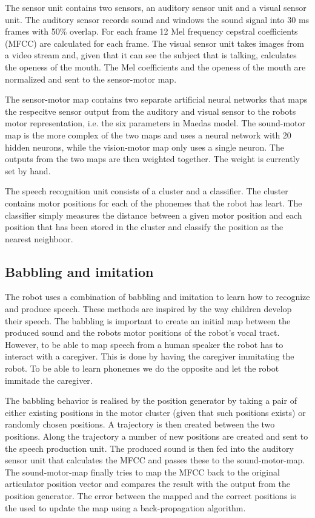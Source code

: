 The sensor unit contains two sensors, an auditory sensor unit and a
visual sensor unit. The auditory sensor records sound and windows the
sound signal into 30 ms frames with 50\% overlap. For each frame 12
Mel frequency cepstral coefficients (MFCC) are calculated for each
frame. The visual sensor unit takes images from a video stream and,
given that it can see the subject that is talking, calculates the
openess of the mouth. The Mel coefficients and the openess of the
mouth are normalized and sent to the sensor-motor map.

The sensor-motor map contains two separate artificial neural networks
that maps the respecitve sensor output from the auditory and visual
sensor to the robots motor representation, i.e. the six parameters in
Maedas model. The sound-motor map is the more complex of the two maps
and uses a neural network with 20 hidden neurons, while the
vision-motor map only uses a single neuron. The outputs from the two
maps are then weighted together. The weight is currently set by hand.

The speech recognition unit consists of a cluster and a
classifier. The cluster contains motor positions for each of the
phonemes that the robot has leart. The classifier simply measures the
distance between a given motor position and each position that has
been stored in the cluster and classify the position as the nearest
neighboor.
 
\subsection{Babbling and imitation}
The robot uses a combination of babbling and imitation to learn how to
recognize and produce speech. These methods are inspired by the way
children develop their speech. The babbling is important to create an
initial map between the produced sound and the robots motor positions
of the robot's vocal tract. However, to be able to map speech from a
human speaker the robot has to interact with a caregiver. This is done
by having the caregiver immitating the robot. To be able to learn
phonemes we do the opposite and let the robot immitade the caregiver.

The babbling behavior is realised by the position generator by taking
a pair of either existing positions in the motor cluster (given that
such positions exists) or randomly chosen positions. A trajectory is
then created between the two positions. Along the trajectory a number
of new positions are created and sent to the speech production
unit. The produced sound is then fed into the auditory sensor unit
that calculates the MFCC and passes these to the sound-motor-map. The
sound-motor-map finally tries to map the MFCC back to the original
articulator position vector and compares the result with the output
from the position generator. The error between the mapped and the
correct positions is the used to update the map using a
back-propagation algorithm.

